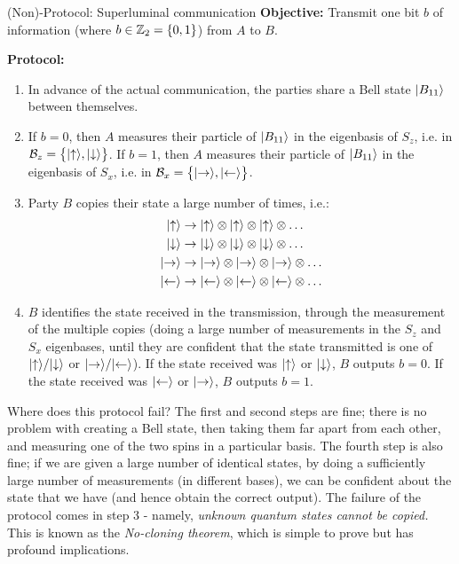 \begin{blankbox}{(Non)-Protocol: Superluminal communication}
    \textbf{Objective:} Transmit one bit $b$ of information (where $b \in \mathbb{Z}_2 = \set{0, 1}$) from $A$ to $B$.

    \noindent
    \textbf{Protocol:}
    \begin{enumerate}
        \item In advance of the actual communication, the parties share a Bell state $\lvert B_{11} \rangle$ between themselves.
    \item If $b = 0$, then $A$ measures their particle of $\lvert B_{11} \rangle$ in the eigenbasis of $S_z$, i.e. in $\mathcal{B}_z = \set{\lvert \uparrow \rangle, \lvert \downarrow \rangle}$. If $b = 1$, then $A$ measures their particle of $\lvert B_{11} \rangle$ in the eigenbasis of $S_x$, i.e. in $\mathcal{B}_x = \set{\lvert \rightarrow \rangle, \lvert \leftarrow \rangle}$. 
    \item Party $B$ copies their state a large number of times, i.e.:
    \begin{equation}
        \begin{split}
            \lvert \uparrow \rangle &\to \lvert \uparrow \rangle \otimes \lvert \uparrow \rangle \otimes \lvert \uparrow \rangle \otimes \ldots
            \\ \lvert \downarrow \rangle &\to \lvert \downarrow \rangle \otimes \lvert \downarrow \rangle \otimes \lvert \downarrow \rangle \otimes \ldots
            \\ \lvert \rightarrow \rangle &\to \lvert \rightarrow \rangle \otimes \lvert \rightarrow \rangle \otimes \lvert \rightarrow \rangle \otimes \ldots
            \\ \lvert \leftarrow \rangle &\to \lvert \leftarrow \rangle \otimes \lvert \leftarrow \rangle \otimes \lvert \leftarrow \rangle \otimes \ldots
        \end{split}
    \end{equation}
    \item $B$ identifies the state received in the transmission, through the measurement of the multiple copies (doing a large number of measurements in the $S_z$ and $S_x$ eigenbases, until they are confident that the state transmitted is one of $\lvert \uparrow \rangle/\lvert \downarrow \rangle$ or $\lvert \rightarrow \rangle/\lvert \leftarrow \rangle$). If the state received was $\lvert \uparrow \rangle$ or $\lvert \downarrow \rangle$, $B$ outputs $b = 0$. If the state received was $\lvert \leftarrow \rangle$ or $\lvert \rightarrow \rangle$, $B$ outputs $b = 1$.
    \end{enumerate}
\end{blankbox}

Where does this protocol fail? The first and second steps are fine; there is no problem with creating a Bell state, then taking them far apart from each other, and measuring one of the two spins in a particular basis. The fourth step is also fine; if we are given a large number of identical states, by doing a sufficiently large number of measurements (in different bases), we can be confident about the state that we have (and hence obtain the correct output). The failure of the protocol comes in step 3 - namely, \emph{unknown quantum states cannot be copied.} This is known as the \emph{No-cloning theorem}, which is simple to prove but has profound implications.

